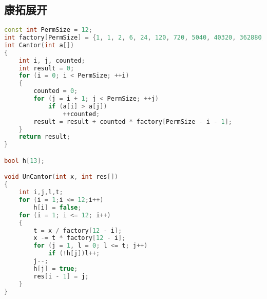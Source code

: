 \subsection{康拓展开}
    \begin{lstlisting}[language=c++]
const int PermSize = 12;
int factory[PermSize] = {1, 1, 2, 6, 24, 120, 720, 5040, 40320, 362880, 3628800, 39916800};
int Cantor(int a[])
{
    int i, j, counted;
    int result = 0;
    for (i = 0; i < PermSize; ++i)
    {
        counted = 0;
        for (j = i + 1; j < PermSize; ++j)
            if (a[i] > a[j])
                ++counted;
        result = result + counted * factory[PermSize - i - 1];
    }
    return result;
}

bool h[13];

void UnCantor(int x, int res[])
{
    int i,j,l,t;
    for (i = 1;i <= 12;i++)
        h[i] = false;
    for (i = 1; i <= 12; i++)
    {
        t = x / factory[12 - i];
        x -= t * factory[12 - i];
        for (j = 1, l = 0; l <= t; j++)
            if (!h[j])l++;
        j--;
        h[j] = true;
        res[i - 1] = j;
    }
}
    \end{lstlisting}